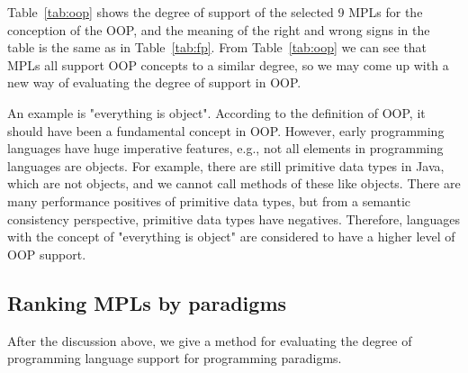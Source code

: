 Table~\ref{tab:oop} shows the degree of support of the selected 9 MPLs for the conception of the OOP\@,
and the meaning of the right and wrong signs in the table is the same as in Table~\ref{tab:fp}.
From Table~\ref{tab:oop} we can see that MPLs all support OOP concepts to a similar degree,
so we may come up with a new way of evaluating the degree of support in OOP\@.


An example is "everything is object".
According to the definition of OOP, it should have been a fundamental concept in OOP\@.
However, early programming languages have huge imperative features, e.g.,
not all elements in programming languages are objects.
For example, there are still primitive data types in Java, which are not objects,
and we cannot call methods of these like objects.
There are many performance positives of primitive data types,
but from a semantic consistency perspective, primitive data types have negatives.
Therefore, languages with the concept of "everything is object" are
considered to have a higher level of OOP support.


\subsection{Ranking MPLs by paradigms}

After the discussion above, we give a method for evaluating the degree of
programming language support for programming paradigms.

